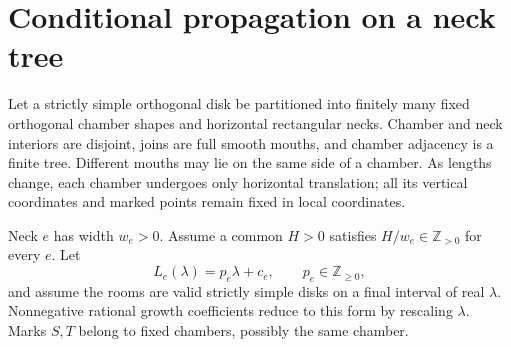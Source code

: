 \documentclass[11pt]{article}
\theoremstyle{definition}
\newcommand{\Z}{\mathbb Z}
\begin{document}
\section{Conditional propagation on a neck tree}
Let a strictly simple orthogonal disk be partitioned into finitely many fixed orthogonal chamber shapes and horizontal rectangular necks. Chamber and neck interiors are disjoint, joins are full smooth mouths, and chamber adjacency is a finite tree. Different mouths may lie on the same side of a chamber. As lengths change, each chamber undergoes only horizontal translation; all its vertical coordinates and marked points remain fixed in local coordinates.

Neck $e$ has width $w_e>0$. Assume a common $H>0$ satisfies $H/w_e\in\Z_{>0}$ for every $e$. Let
\[
 L_e(\lambda)=p_e\lambda+c_e,\qquad p_e\in\Z_{\ge0},
\]
and assume the rooms are valid strictly simple disks on a final interval of real $\lambda$. Nonnegative rational growth coefficients reduce to this form by rescaling $\lambda$. Marks $S,T$ belong to fixed chambers, possibly the same chamber.
\end{document}
